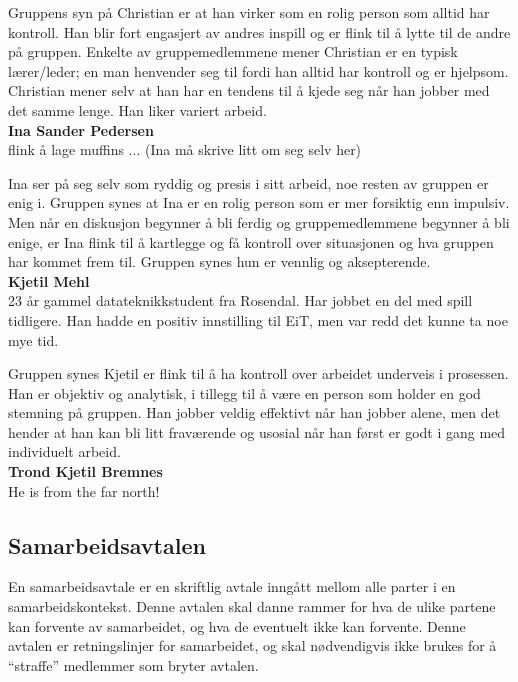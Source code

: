 Gruppens syn på Christian er at han virker som en rolig person som alltid har kontroll. Han blir fort engasjert av andres inspill og er flink til å lytte til de andre på gruppen. Enkelte av gruppemedlemmene mener Christian er en typisk lærer/leder; en man henvender seg til fordi han alltid har kontroll og er hjelpsom. Christian mener selv at han har en tendens til å kjede seg når han jobber med det samme lenge. Han liker variert arbeid. \\


\textbf{Ina Sander Pedersen}\\
flink å lage muffins ... (Ina må skrive litt om seg selv her)

Ina ser på seg selv som ryddig og presis i sitt arbeid, noe resten av gruppen er enig i. Gruppen synes at Ina er en rolig person som er mer forsiktig enn impulsiv. Men når en diskusjon begynner å bli ferdig og gruppemedlemmene begynner å bli enige, er Ina flink til å kartlegge og få kontroll over situasjonen og hva gruppen har kommet frem til. Gruppen synes hun er vennlig og aksepterende.\\


\textbf{Kjetil Mehl}\\
23 år gammel datateknikkstudent fra Rosendal. Har jobbet en del med
spill tidligere. Han hadde en positiv innstilling til EiT, men var
redd det kunne ta noe mye tid.

Gruppen synes Kjetil er flink til å ha kontroll over arbeidet underveis i prosessen. Han er objektiv og analytisk, i tillegg til å være en person som holder en god stemning på gruppen. Han jobber veldig effektivt når han jobber alene, men det hender at han kan bli litt fraværende og usosial når han først er godt i gang med individuelt arbeid. \\


\textbf{Trond Kjetil Bremnes}\\
He is from the far north! \\

\subsection{Samarbeidsavtalen}
En samarbeidsavtale \cite{samarbeidsavtale} er en skriftlig avtale
inngått mellom alle parter i en samarbeidskontekst. Denne avtalen skal
danne rammer for hva de ulike partene kan forvente av samarbeidet, og
hva de eventuelt ikke kan forvente. Denne avtalen er retningslinjer for
samarbeidet, og skal nødvendigvis ikke brukes for å ``straffe''
medlemmer som bryter avtalen.

